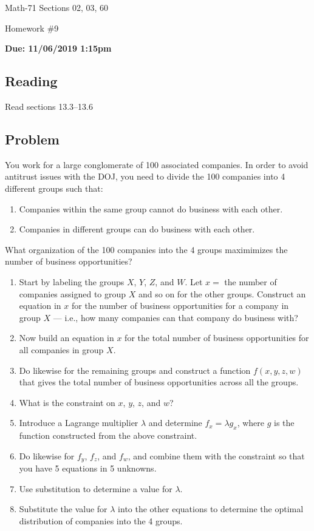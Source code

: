 \documentclass[letterpaper,12pt,fleqn]{article}
\renewcommand{\l}{\lambda}
\begin{document}
\begin{center}
  \large
  Math-71 Sections 02, 03, 60

  \Large
  Homework \#9

  \large
  \textbf{Due: 11/06/2019 1:15pm}
\end{center}

\subsection*{Reading}

Read sections 13.3--13.6

\subsection*{Problem}

You work for a large conglomerate of 100 associated companies.  In order to avoid antitrust issues with the DOJ,
you need to divide the 100 companies into 4 different groups such that:
\begin{enumerate}
\item Companies within the same group cannot do business with each other.
\item Companies in different groups can do business with each other.
\end{enumerate}
What organization of the 100 companies into the 4 groups maximimizes the number of business opportunities?

\begin{enumerate}[label={\alph*)}]
\item Start by labeling the groups \(X\), \(Y\), \(Z\), and \(W\).  Let \(x=\) the number of companies assigned to
  group \(X\) and so on for the other groups.  Construct an equation in \(x\) for the number of business
  opportunities for a company in group \(X\) --- i.e., how many companies can that company do business with?
\item Now build an equation in \(x\) for the total number of business opportunities for all companies in group
  \(X\).
\item Do likewise for the remaining groups and construct a function \(f(x,y,z,w)\) that gives the total number of
  business opportunities across all the groups.
\item What is the constraint on \(x\), \(y\), \(z\), and \(w\)?
\item Introduce a Lagrange multiplier \(\l\) and determine \(f_x=\l g_x\), where \(g\) is the function constructed
  from the above constraint.
\item Do likewise for \(f_y\), \(f_z\), and \(f_w\), and combine them with the constraint so that you have 5
  equations in 5 unknowns.
\item Use substitution to determine a value for \(\l\).
\item Substitute the value for \(\l\) into the other equations to determine the optimal distribution of companies
  into the 4 groups.
\end{enumerate}
\end{document}
